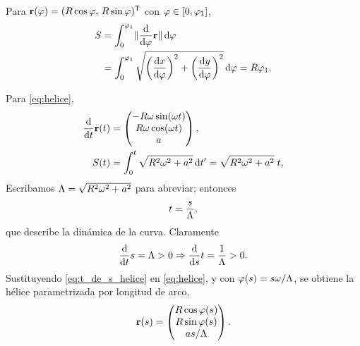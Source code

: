 \begin{ejemplo}[Circunferencia]
  \label{ej:arco_circulo}
  Para $\mathbf{r}(\varphi)=(R\cos\varphi,\,R\sin\varphi)^{\mathsf{T}}$ con
  $\varphi\in[0,\varphi_1]$,
  \begin{equation}
    \label{eq:arco_circulo}
    \begin{aligned}
      S&=\int_{0}^{\varphi_1}\lVert \frac{\mathrm{d}}{\mathrm{d}\varphi}\mathbf{r} \rVert\,\mathrm{d}\varphi\\
       &=\int_{0}^{\varphi_1}\sqrt{\left( \frac{\mathrm{d}x}{\mathrm{d}\varphi} \right)^2
          +\left( \frac{\mathrm{d}y}{\mathrm{d}\varphi} \right)^2}\,\mathrm{d}\varphi=R\varphi_1 .
    \end{aligned}
  \end{equation}
\end{ejemplo}

\begin{ejemplo}[H\'elice]
  \label{ej:arco_helice}
  Para \eqref{eq:helice},
  \begin{equation}
    \label{eq:arco_helice}
    \begin{aligned}
      \frac{\mathrm{d}}{\mathrm{d}t}\mathbf{r}(t)&=
      \begin{pmatrix}
        -R\omega\sin(\omega t)\\
        R\omega\cos(\omega t)\\
        a
      \end{pmatrix},\\
      S(t)&=\int_{0}^{t}\sqrt{R^2\omega^2+a^2}\,\mathrm{d} t'
           =\sqrt{R^2\omega^2+a^2}\;t,
    \end{aligned}
  \end{equation}
  Escribamos $\Lambda=\sqrt{R^2\omega^2+a^2}$ para abreviar; entonces
  \begin{equation}
    \label{eq:t_de_s_helice}
    t=\frac{s}{\Lambda},
  \end{equation}
  que describe la din\'amica de la curva. Claramente
  \begin{equation}
    \label{eq:derivadas_arco_helice}
    \frac{\mathrm{d}}{\mathrm{d}t}s=\Lambda>0
    \Rightarrow
    \frac{\mathrm{d}}{\mathrm{d}s}t=\frac{1}{\Lambda}>0 .
  \end{equation}
  Sustituyendo \eqref{eq:t_de_s_helice} en \eqref{eq:helice}, y con
  $\varphi(s)=s\omega/\Lambda$, se obtiene la h\'elice parametrizada por longitud de
  arco,
  \begin{equation}
    \label{eq:helice_arco}
    \mathbf{r}(s)=
    \begin{pmatrix}
      R\cos\varphi(s)\\
      R\sin\varphi(s)\\
      a s/\Lambda
    \end{pmatrix}.
  \end{equation}
\end{ejemplo}

